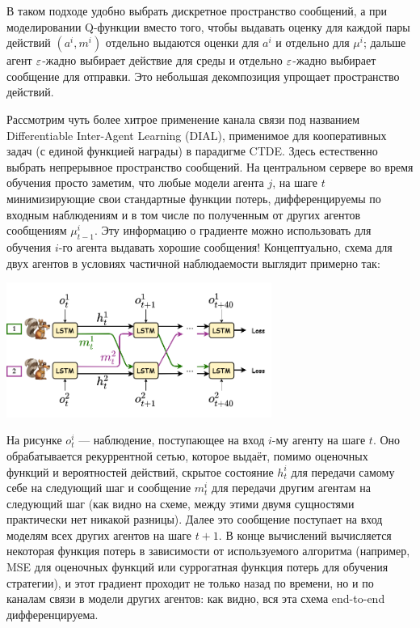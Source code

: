 \begin{remark}
В таком подходе удобно выбрать дискретное пространство сообщений, а при моделировании Q-функции вместо того, чтобы выдавать оценку для каждой пары действий $(a^i, m^i)$ отдельно выдаются оценки для $a^i$ и отдельно для $\mu^i$; дальше агент $\varepsilon$-жадно выбирает действие для среды и отдельно $\varepsilon$-жадно выбирает сообщение для отправки. Это небольшая декомпозиция упрощает пространство действий.
\end{remark}

Рассмотрим чуть более хитрое применение канала связи под названием Differentiable Inter-Agent Learning (DIAL), применимое для кооперативных задач (с единой функцией награды) в парадигме CTDE. Здесь естественно выбрать непрерывное пространство сообщений. На центральном сервере во время обучения просто заметим, что любые модели агента $j$, на шаге $t$ минимизирующие свои стандартные функции потерь, дифференцируемы по входным наблюдениям и в том числе по полученным от других агентов сообщениям $\mu^i_{t-1}$. Эту информацию о градиенте можно использовать для обучения $i$-го агента выдавать хорошие сообщения! Концептуально, схема для двух агентов в условиях частичной наблюдаемости выглядит примерно так:

\begin{center}
    \includegraphics[width=0.65\textwidth]{Images/Communication.png}
\end{center}

На рисунке $o_t^i$ --- наблюдение, поступающее на вход $i$-му агенту на шаге $t$. Оно обрабатывается рекуррентной сетью, которое выдаёт, помимо оценочных функций и вероятностей действий, скрытое состояние $h^i_{t}$ для передачи самому себе на следующий шаг и сообщение $m^i_t$ для передачи другим агентам на следующий шаг (как видно на схеме, между этими двумя сущностями практически нет никакой разницы). Далее это сообщение поступает на вход моделям всех других агентов на шаге $t + 1$. В конце вычислений вычисляется некоторая функция потерь в зависимости от используемого алгоритма (например, MSE для оценочных функций или суррогатная функция потерь для обучения стратегии), и этот градиент проходит не только назад по времени, но и по каналам связи в модели других агентов: как видно, вся эта схема end-to-end дифференцируема.
